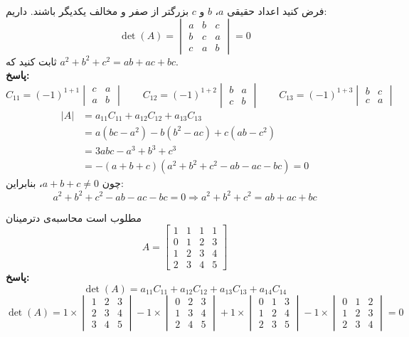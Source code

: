 \begin{example}
	فرض کنید اعداد حقیقی $a$، $b$ و $c$ بزرگتر از صفر و مخالف یکدیگر باشند. داریم:
	\[
	\det(A)=
	\begin{vmatrix}
		a & b & c \\
		b & c & a \\
		c & a & b
	\end{vmatrix} = 0
	\]
	ثابت کنید که
	$a^2+b^2+c^2 = ab+ac+bc$.
	\\ \textbf{پاسخ:}
	\[
	C_{11}=(-1)^{1+1}
	\begin{vmatrix}
		c & a \\
		a & b
	\end{vmatrix}
	\qquad
	C_{12}=(-1)^{1+2}
	\begin{vmatrix}
		b & a \\
		c & b
	\end{vmatrix}
	\qquad
	C_{13}=(-1)^{1+3}
	\begin{vmatrix}
		b & c \\
		c & a
	\end{vmatrix}
	\]
	\begin{align*}
		|A| &= a_{11}C_{11} + a_{12}C_{12} + a_{13}C_{13} \\
		&= a(bc-a^2) -b(b^2-ac) +c(ab-c^2) \\
		&= 3abc-a^3+b^3+c^3 \\
		&= -(a+b+c)(a^2+b^2+c^2-ab-ac-bc) = 0
	\end{align*}
	چون
	$a+b+c \neq 0$،
	بنابراین:
	$$a^2+b^2+c^2-ab-ac-bc = 0 \Rightarrow a^2+b^2+c^2 = ab+ac+bc$$
\end{example}

\begin{example}
	مطلوب است محاسبه‌ی دترمینان
	\[
	A=
	\begin{bmatrix}
		1 & 1 & 1 & 1 \\
		0 & 1 & 2 & 3 \\
		1 & 2 & 3 & 4 \\
		2 & 3 & 4 & 5
	\end{bmatrix}
	\]
	\textbf{پاسخ:}
	\[
	\det(A)= a_{11}C_{11} + a_{12}C_{12} + a_{13}C_{13} + a_{14}C_{14}
	\]
	\[
		\det(A) =
		1 \times
		\begin{vmatrix}
			1 & 2 & 3 \\
			2 & 3 & 4 \\
			3 & 4 & 5
		\end{vmatrix}
		-1 \times
		\begin{vmatrix}
			0 & 2 & 3 \\
			1 & 3 & 4 \\
			2 & 4 & 5
		\end{vmatrix}
		+1 \times
		\begin{vmatrix}
			0 & 1 & 3 \\
			1 & 2 & 4 \\
			2 & 3 & 5
		\end{vmatrix}
		-1 \times
		\begin{vmatrix}
			0 & 1 & 2 \\
			1 & 2 & 3 \\
			2 & 3 & 4
		\end{vmatrix}
		= 0
	\]
\end{example}


